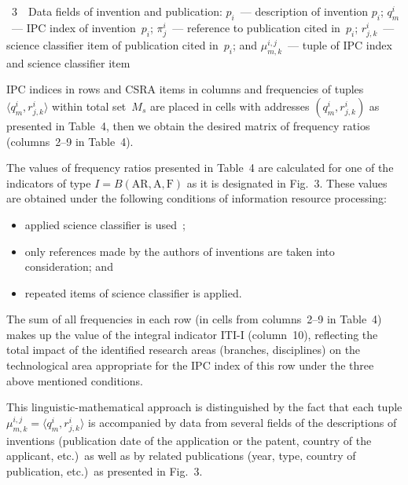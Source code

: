 \begin{multicols}{2}
{\vspace*{2pt}


\noindent
{{\figurename~3}\ \ \small{Data fields of invention and publication:
    $p_i$~--- description of invention $p_i$; $q_m^i$~--- IPC index of invention~$p_i$; $\pi_j^i$~---
    reference to publication cited in~$p_i$;
    $r^i_{j,k}$~--- science classifier item of publication cited in~$p_i$;
    and $\mu_{m,k}^{i,j}$~--- tuple of IPC index and science classifier
    item}}
}

\vspace*{12pt}



\noindent 
IPC indices in rows and  CSRA items in columns and  frequencies of tuples 
$\langle q_m^i, r^i_{j,k}\rangle$ within total set~$M_s$ are placed in cells with addresses 
$(q_m^i, r^i_{j,k})$ as presented in Table~4, then we obtain the desired matrix of 
frequency ratios (columns~2--9 in Table~4).
    
   
     
     The values of frequency ratios presented in Table~4 are calculated for one of the 
indicators of type $I = B(\mathrm{AR, A, F})$ as it is designated in Fig.~3. These values are 
obtained under the following conditions of information resource processing:
     \begin{itemize}
\item applied science classifier is used~\cite{25-zat};
\item only references made by the authors of inventions are taken into 
consideration; and
\item repeated items of science classifier is applied.
\end{itemize}

     The sum of all frequencies in each row (in cells from columns~2--9 in Table~4) 
makes up the value of the integral indicator ITI-I (column~10), reflecting the total 
impact of the identified research areas (branches, disciplines) on the technological 
area appropriate for the IPC index of this row under the three above mentioned 
conditions.
     
     This linguistic-mathematical approach is distinguished by the fact  that each 
tuple $\mu_{m,k}^{i,j}=\langle q^i_m, r^i_{j,k}\rangle$  is accompanied by data 
from several fields of the descriptions of inventions (publication date of the 
application or the patent, country of the applicant, etc.)\ as well as by related 
publications (year, type, country of publication, etc.)\ as presented in Fig.~3.
     

\end{multicols}
